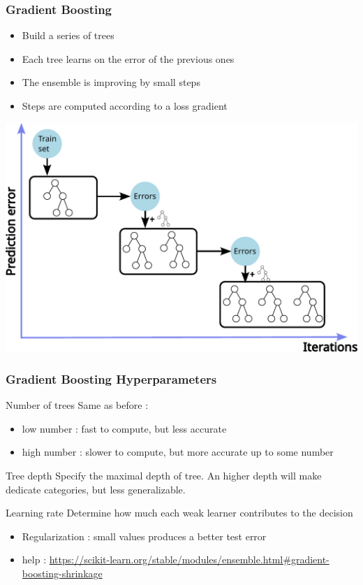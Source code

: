 \documentclass[11pt]{beamer}
\begin{document}
\begin{frame}
  \frametitle{Gradient Boosting}
  \begin{itemize}
  \item Build a series of trees
  \item Each tree learns on the error of the previous ones
  \item The ensemble is improving by small steps
  \item Steps are computed according to a loss gradient
  \end{itemize}

  \includegraphics[width=\textwidth]{gradient_boosting}
\end{frame}

\begin{frame}[fragile]
  \frametitle{Gradient Boosting Hyperparameters}

  \begin{block}{Number of trees}
    Same as before : 
    \begin{itemize}
    \item low number : fast to compute, but less accurate
    \item high number : slower to compute, but more accurate up to some number
    \end{itemize}
  \end{block}

  \begin{block}{Tree depth}
    Specify the maximal depth of tree. An higher depth will make dedicate
    categories, but less generalizable.
  \end{block}
\end{frame}

  \begin{block}{Learning rate}
    Determine how much each weak learner contributes to the decision
    \begin{itemize}
    \item Regularization : small values produces a better test error
    \item help : \url{https://scikit-learn.org/stable/modules/ensemble.html#gradient-boosting-shrinkage}
    \end{itemize}
  \end{block}
\end{document}
